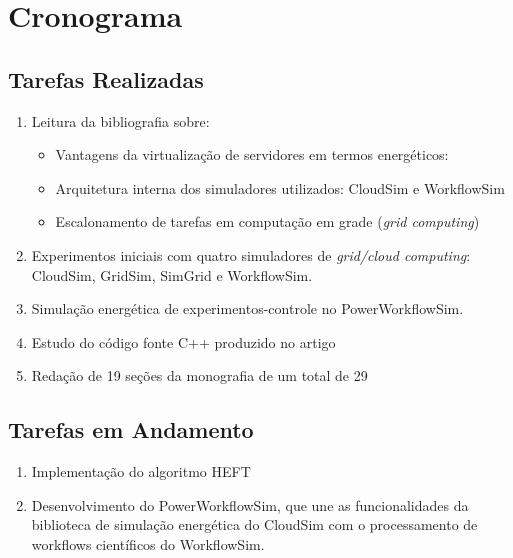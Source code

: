 \setcounter{chapter}{-1}
\chapter{Cronograma}
\label{cap:cronograma}

\section{Tarefas Realizadas}
	\label{sec:tarefas_realizadas}
	\begin{enumerate}
		\item Leitura da bibliografia sobre:
		\begin{itemize}
			\item Vantagens da virtualização de servidores em termos energéticos:
				\cite{barroso:case_energy_proportional}
				\cite{beloglazov:energy_efficient_allocation_virtual_machines}
				\cite{berl:energy_efficient_cloud_computing}
				\cite{feng:green500_encouraging_sustainable_supercomputing}
				\cite{murugesan:harnessing_green_it}
				\cite{vmware:virtualization_right_sizes_it}
				\cite{rivoire:models_metrics_enable_energy_efficient_optimizations}
			\item Arquitetura interna dos simuladores utilizados: CloudSim e WorkflowSim
				\cite{calheiros:cloudsim}
				\cite{chen:workflowsim}
			\item Escalonamento de tarefas em computação em grade (\emph{grid 
			computing})
				\cite{chaves:scheduling_software_requirements}
				\cite{batista:embedding_software_requirements}
		\end{itemize}
		\item Experimentos iniciais com quatro simuladores de \emph{grid/cloud
			computing}: CloudSim, GridSim, SimGrid e WorkflowSim.
		\item Simulação energética de experimentos-controle no PowerWorkflowSim.
		\item Estudo do código fonte C++ produzido no artigo
			\cite{chaves:scheduling_software_requirements} 
		\item Redação de 19 seções da monografia de um total de 29
	\end{enumerate}

\section{Tarefas em Andamento}
\label{sec:tarefas_andamento}
	\begin{enumerate}
		\item Implementação do algoritmo HEFT
		\item Desenvolvimento do PowerWorkflowSim, que une as funcionalidades
		da biblioteca de simulação energética do CloudSim com o processamento de
		workflows científicos do WorkflowSim.
	\end{enumerate}

